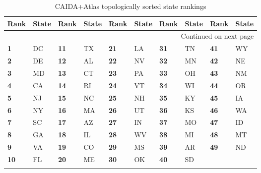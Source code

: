 \begin{table}[h]
    \centering
    \begin{longtable}{ll|ll|ll|ll|ll}
        \textbf{Rank} & \textbf{State} & \textbf{Rank} & \textbf{State} & \textbf{Rank} & \textbf{State} & \textbf{Rank} & \textbf{State} & \textbf{Rank} & \textbf{State} \\
        \midrule
        \endhead
        \midrule
        \multicolumn{10}{r}{{Continued on next page}} \\
        \endfoot
        \endlastfoot
        \textbf{1 } & DC & \textbf{11} & TX & \textbf{21} &  LA & \textbf{31} & TN & \textbf{41} &    WY \\
        \textbf{2 } & DE & \textbf{12} & AL & \textbf{22} &  NV & \textbf{32} & MN & \textbf{42} &    NE \\
        \textbf{3 } & MD & \textbf{13} & CT & \textbf{23} &  PA & \textbf{33} & OH & \textbf{43} &    NM \\
        \textbf{4 } & CA & \textbf{14} & RI & \textbf{24} &  VT & \textbf{34} & WI & \textbf{44} &    OR \\
        \textbf{5 } & NJ & \textbf{15} & NC & \textbf{25} &  NH & \textbf{35} & KY & \textbf{45} &    IA \\
        \textbf{6 } & NY & \textbf{16} & MA & \textbf{26} &  UT & \textbf{36} & KS & \textbf{46} &    WA \\
        \textbf{7 } & SC & \textbf{17} & AZ & \textbf{27} &  IN & \textbf{37} & MO & \textbf{47} &    ID \\
        \textbf{8 } & GA & \textbf{18} & IL & \textbf{28} &  WV & \textbf{38} & MI & \textbf{48} &    MT \\
        \textbf{9 } & VA & \textbf{19} & CO & \textbf{29} &  MS & \textbf{39} & AR & \textbf{49} &    ND \\
        \textbf{10} & FL & \textbf{20} & ME & \textbf{30} &  OK & \textbf{40} & SD &             &       \\
        \caption{CAIDA+Atlas topologically sorted state rankings}
        \label{tab:caida_topological_state_rankings}
    \end{longtable}
\end{table}